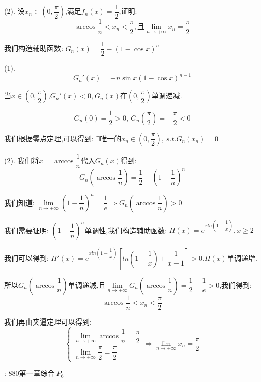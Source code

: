 (2). 设$x_{n}\in(0,\dfrac{\pi}{2})$,满足$f_{n}(x)=\dfrac{1}{2}$,证明:  $$\arccos \dfrac{1}{n}<x_{n}<\dfrac{\pi}{2},\text{且}\lim\limits_{n\rightarrow +\infty}x_{n}=\dfrac{\pi}{2}$$
\begin{solution}
	
	我们构造辅助函数:  $G_{n}(x)=\dfrac{1}{2}-(1-\cos x)^{n}$
	
	(1). $$G_{n}'(x)=-n\sin x(1-\cos x)^{n-1}$$
	
	当$x\in(0,\dfrac{\pi}{2})$,$G_{n}'(x)<0$,$\ G_{n}(x)$在$(0,\dfrac{\pi}{2})$单调递减.
	
	$$G_{n}(0)=\dfrac{1}{2}>0,\ G_{n}(\dfrac{\pi}{2})=-\dfrac{\pi}{2}<0$$
	
	我们根据零点定理,可以得到:  $\exists \text{唯一的}x_{n}\in(0,\dfrac{\pi}{2}),\ s.t. G_{n}(x_{n})=0$
	
	(2). 我们将$x=\arccos\dfrac{1}{n}$代入$G_{n}(x)$得到:  
	$$G_{n}(\arccos\dfrac{1}{n})=\dfrac{1}{2}-(1-\dfrac{1}{n})^{n}$$
	
	我们知道:  $\lim\limits_{n\rightarrow+\infty}(1-\dfrac{1}{n})^{n}=\dfrac{1}{e}\Rightarrow G_{n}(\arccos\dfrac{1}{n})>0$
	
	我们需要证明:  $(1-\dfrac{1}{n})^n$单调性,我们构造辅助函数:  $H(x)=e^{xln(1-\dfrac{1}{x})},x\geq 2$
	
	我们可以得到:  $H'(x)=e^{xln(1-\dfrac{1}{x})}[ln(1-\dfrac{1}{x})+\dfrac{1}{x-1}]>0$,$H(x)$单调递增.
	
	所以$G_{n}(\arccos\dfrac{1}{n})$单调递减,且$\lim\limits_{n\rightarrow+\infty}G_{n}(\arccos\dfrac{1}{n})=\dfrac{1}{2}-\dfrac{1}{e}>0$,我们得到:  $$\arccos \dfrac{1}{n}<x_{n}<\dfrac{\pi}{2}$$
	
	我们再由夹逼定理可以得到:  
	$$\left\lbrace
	\begin{array}{l}
		\lim\limits_{n\rightarrow  +\infty}\arccos \dfrac{1}{n}=\dfrac{\pi}{2}\\
		\lim\limits_{n\rightarrow  +\infty}\dfrac{\pi}{2}=\dfrac{\pi}{2}
	\end{array}
	\right. \Rightarrow \lim\limits_{n\rightarrow +\infty}x_{n}=\dfrac{\pi}{2}$$
	
\end{solution}
\begin{anymark}[注]
	[题目来源]:  $880\text{第一章综合} \ P_{6}$
\end{anymark}

